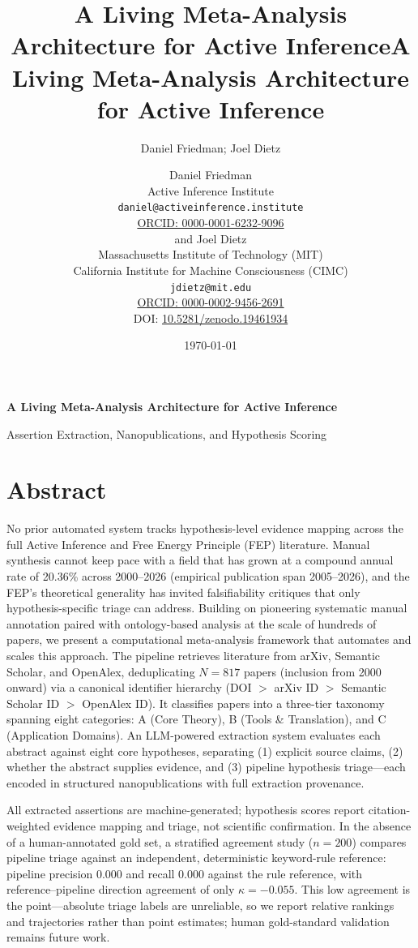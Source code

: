 \documentclass[
  english,
]{article}
\title{A Living Meta-Analysis Architecture for Active Inference}
\author{Daniel Friedman; Joel Dietz}
\date{}
\title{A Living Meta-Analysis Architecture for Active Inference}
\author{Daniel Friedman\\\footnotesize{Active Inference Institute}\\\footnotesize{\texttt{daniel@activeinference.institute}}\\\footnotesize{\href{https://orcid.org/0000-0001-6232-9096}{ORCID: 0000-0001-6232-9096}} \\and Joel Dietz\\\footnotesize{Massachusetts Institute of Technology (MIT)}\\\footnotesize{California Institute for Machine Consciousness (CIMC)}\\\footnotesize{\texttt{jdietz@mit.edu}}\\\footnotesize{\href{https://orcid.org/0000-0002-9456-2691}{ORCID: 0000-0002-9456-2691}} \\ \footnotesize{DOI: \href{https://doi.org/10.5281/zenodo.19461934}{10.5281/zenodo.19461934}}}
\date{\today}
\begin{document}
\begin{titlepage}
\centering
\vspace*{2cm}
{\LARGE\bfseries A Living Meta-Analysis Architecture for Active Inference\par}
\vspace{0.75em}
{\large Assertion Extraction, Nanopublications, and Hypothesis Scoring\par}
\vfill
\makeatletter
{\@author\par}
\vspace{1em}
{\@date\par}
\makeatother
\vfill
\end{titlepage}
\thispagestyle{empty}
\tableofcontents
\newpage

\section{Abstract}\label{abstract}

No prior automated system tracks hypothesis-level evidence mapping
across the full Active Inference and Free Energy Principle (FEP)
literature. Manual synthesis cannot keep pace with a field that has
grown at a compound annual rate of 20.36\% across 2000--2026 (empirical
publication span 2005--2026), and the FEP's theoretical generality has
invited falsifiability critiques that only hypothesis-specific triage
can address. Building on pioneering systematic manual annotation paired
with ontology-based analysis at the scale of hundreds of papers, we
present a computational meta-analysis framework that automates and
scales this approach. The pipeline retrieves literature from arXiv,
Semantic Scholar, and OpenAlex, deduplicating \(N = 817\) papers
(inclusion from 2000 onward) via a canonical identifier hierarchy (DOI
\(>\) arXiv ID \(>\) Semantic Scholar ID \(>\) OpenAlex ID). It
classifies papers into a three-tier taxonomy spanning eight categories:
A (Core Theory), B (Tools \& Translation), and C (Application Domains).
An LLM-powered extraction system evaluates each abstract against eight
core hypotheses, separating (1) explicit source claims, (2) whether the
abstract supplies evidence, and (3) pipeline hypothesis triage---each
encoded in structured nanopublications with full extraction provenance.

All extracted assertions are machine-generated; hypothesis scores report
citation-weighted evidence mapping and triage, not scientific
confirmation. In the absence of a human-annotated gold set, a stratified
agreement study (\(n = 200\)) compares pipeline triage against an
independent, deterministic keyword-rule reference: pipeline precision
0.000 and recall 0.000 against the rule reference, with
reference--pipeline direction agreement of only \(\kappa = -0.055\).
This low agreement is the point---absolute triage labels are unreliable,
so we report relative rankings and trajectories rather than point
estimates; human gold-standard validation remains future work.
\end{document}
